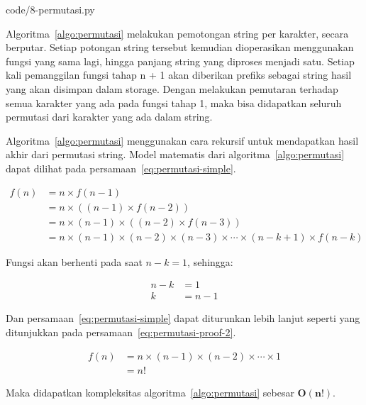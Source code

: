 
                {code/8-permutasi.py}

Algoritma~\ref{algo:permutasi} melakukan pemotongan string per karakter, secara berputar. Setiap potongan string tersebut kemudian dioperasikan menggunakan fungsi yang sama lagi, hingga panjang string yang diproses menjadi satu. Setiap kali pemanggilan fungsi tahap n + 1 akan diberikan prefiks sebagai string hasil yang akan disimpan dalam storage. Dengan melakukan pemutaran terhadap semua karakter yang ada pada fungsi tahap 1, maka bisa didapatkan seluruh permutasi dari karakter yang ada dalam string.

Algoritma~\ref{algo:permutasi} menggunakan cara rekursif untuk mendapatkan hasil akhir dari permutasi string. Model matematis dari algoritma~\ref{algo:permutasi} dapat dilihat pada persamaan~\ref{eq:permutasi-simple}.

\begin{equation}
    \label{eq:permutasi-simple}
    \begin{split}
	f(n) & = n \times f(n - 1) \\
         & = n \times ((n - 1) \times f(n - 2)) \\
         & = n \times (n - 1) \times ((n - 2) \times f(n - 3)) \\
         & = n \times (n - 1) \times (n - 2) \times (n - 3) \times \cdots \times (n - k + 1) \times f(n - k)
    \end{split}
\end{equation}

Fungsi akan berhenti pada saat $n - k = 1$, sehingga:

\begin{equation}
    \label{eq:permutasi-proof-1}
    \begin{split}
	n - k & = 1 \\
	    k & = n - 1
    \end{split}
\end{equation}

Dan persamaan~\ref{eq:permutasi-simple} dapat diturunkan lebih lanjut seperti yang ditunjukkan pada persamaan~\ref{eq:permutasi-proof-2}.

\begin{equation}
    \label{eq:permutasi-proof-2}
    \begin{split}
        f(n) & = n \times (n - 1) \times (n - 2) \times \cdots \times 1 \\
             & = n!
    \end{split}
\end{equation}

Maka didapatkan kompleksitas algoritma~\ref{algo:permutasi} sebesar $\pmb{O(n!)}$.

